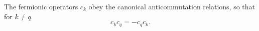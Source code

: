 \documentclass{article}
\begin{document}
The fermionic operators $c_k$ obey the canonical anticommutation relations, so that for $k\neq q$
\begin{equation}
c_k c_q = - c_q c_k .
\label{eq:anti}
\end{equation}
\end{document}
